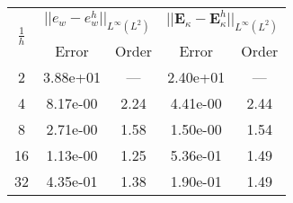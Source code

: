 \begin{table}[hp]
	\centering
	\begin{tabular}{ccccc}
		\hline 
		\multirow{2}{*}{$\frac{1}{h}$} & \multicolumn{2}{c}{$||e_w - e_w^h||_{L^{\infty}(L^2)}$}  & \multicolumn{2}{c}{$||\bm{E}_\kappa - \bm{E}_\kappa^h||_{L^{\infty}(L^2)}$}   \\ 
		& Error & Order  & Error & Order  \\
		\hline 
		2  & 3.88e+01 & ---  & 2.40e+01 & ---  \\ 
		4  & 8.17e-00 & 2.24 & 4.41e-00 & 2.44 \\ 
		8  & 2.71e-00 & 1.58 & 1.50e-00 & 1.54 \\ 
		16 & 1.13e-00 & 1.25 & 5.36e-01 & 1.49 \\ 
		32 & 4.35e-01 & 1.38 & 1.90e-01 & 1.49 \\ 
		\hline 
	\end{tabular} 
	\captionsetup{width=0.95\linewidth}
	\vspace{1mm}
	\label{tab:reskirBellDG3_CSFS}
\end{table}

